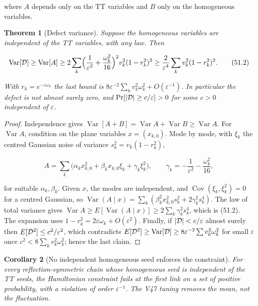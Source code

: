 \documentclass[11pt]{article}
\newtheorem{theorem}{Theorem}[section]
\newtheorem{corollary}[theorem]{Corollary}
\theoremstyle{remark}
\begin{document}
where \(A\) depends only on the TT variables and \(B\) only on the
homogeneous variables.

\begin{theorem}[Defect variance]
\label{thm:v19v48-variance}
Suppose the homogeneous variables are independent of the TT variables,
with any law.  Then

\[
 \operatorname{Var}[{\cal D}]\geq\operatorname{Var}[A]
 \geq2\sum_k\Bigl(\frac1{\varepsilon^2}+\frac{\omega_k^2}{16}\Bigr)^2v_k^2(1-r_k^2)^2
 \geq\frac{2}{\varepsilon^4}\sum_kv_k^2(1-r_k^2)^2.                      \tag{51.2}
\]

With \(r_k=e^{-\varepsilon\omega_k}\) the last bound is
\(8\varepsilon^{-2}\sum_kv_k^2\omega_k^2+O(\varepsilon^{-1})\).  In
particular the defect is not almost surely zero, and
\(\Pr[|{\cal D}|\geq c/\varepsilon]>0\) for some \(c>0\) independent of
\(\varepsilon\).
\end{theorem}

\begin{proof}
Independence gives \(\operatorname{Var}[A+B]=\operatorname{Var}A+\operatorname{Var}B\geq\operatorname{Var}A\).
For \(\operatorname{Var}A\), condition on the plane variables
\(x=(x_{k,0})\).  Mode by mode, with \(\xi_k\) the centred Gaussian
noise of variance \(s_k^2=v_k(1-r_k^2)\),

\[
 A=\sum_k\bigl(\alpha_kx_{k,0}^2+\beta_kx_{k,0}\xi_k+\gamma_k\xi_k^2\bigr),
 \qquad
 \gamma_k=-\frac1{\varepsilon^2}-\frac{\omega_k^2}{16},                  \tag{51.3}
\]

for suitable \(\alpha_k,\beta_k\).  Given \(x\), the modes are
independent, and \(\operatorname{Cov}(\xi_k,\xi_k^2)=0\) for a centred
Gaussian, so
\(\operatorname{Var}(A\mid x)=\sum_k(\beta_k^2x_{k,0}^2s_k^2+2\gamma_k^2s_k^4)\).
The law of total variance gives
\(\operatorname{Var}A\geq E[\operatorname{Var}(A\mid x)]\geq2\sum_k\gamma_k^2s_k^4\),
which is (51.2).  The expansion uses \(1-r_k^2=2\varepsilon\omega_k+O(\varepsilon^2)\).
Finally, if \(|{\cal D}|<c/\varepsilon\) almost surely then
\(E[{\cal D}^2]\leq c^2/\varepsilon^2\), which contradicts
\(E[{\cal D}^2]\geq\operatorname{Var}[{\cal D}]\geq8\varepsilon^{-2}\sum v_k^2\omega_k^2\)
for small \(\varepsilon\) once \(c^2<8\sum_kv_k^2\omega_k^2\); hence the
last claim.
\end{proof}

\begin{corollary}[No independent homogeneous seed enforces the constraint]
\label{cor:v19v48-no-independent}
For every reflection-symmetric chain whose homogeneous seed is
independent of the TT seeds, the Hamiltonian constraint fails at the
first link on a set of positive probability, with a violation of order
\(\varepsilon^{-1}\).  The V47 tuning removes the mean, not the
fluctuation.
\end{corollary}
\end{document}
